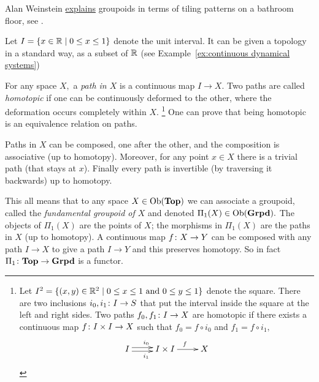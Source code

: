 \documentclass[../main/CT4S-EN-RU]{subfiles}
\begin{document}
\begin{applicationRUS}
\end{applicationRUS}

\begin{exampleENG}
Alan Weinstein \href{http://www.ams.org/notices/199607/weinstein.pdf}{\text explains} groupoids in terms of tiling patterns on a bathroom floor, see \cite{WeA}.
\end{exampleENG}

\begin{exampleRUS}
\end{exampleRUS}

\begin{exampleENG}\label{ex:fundamental groupoid}
Let $I=\{x\in{\mathbb R}{\;|\;}0\leq x\leq 1\}$ denote the unit interval. It can be given a topology in a standard way, as a subset of ${\mathbb R}$ (see Example~\ref{ex:continuous dynamical systems})

For any space $X,$ a {\em path in $X$} is a continuous map $I\to X.$ Two paths are called {\em homotopic} if one can be continuously deformed to the other, where the deformation occurs completely within $X.$
\footnote{
Let $I^2=\{(x,y)\in{\mathbb R}^2{\;|\;}0\leq x\leq 1 \textnormal{ and } 0\leq y\leq 1\}$ denote the square. There are two inclusions $i_0,i_1\colon I\rightarrow S$ that put the interval inside the square at the left and right sides. Two paths $f_0,f_1\colon I\rightarrow X$ are homotopic if there exists a continuous map $f\colon I\times I\rightarrow X$ such that $f_0=f\circ i_0$ and $f_1=f\circ i_1,$ 
$$\xymatrix{I\ar@<-.5ex>[r]_{i_1}\ar@<.5ex>[r]^{i_0}&I\times I\ar[r]^f&X}$$
} 
One can prove that being homotopic is an equivalence relation on paths. 

Paths in $X$ can be composed, one after the other, and the composition is associative (up to homotopy). Moreover, for any point $x\in X$ there is a trivial path (that stays at $x$). Finally every path is invertible (by traversing it backwards) up to homotopy. 

This all means that to any space $X\in\operatorname{Ob}({\mathbf{Top}})$ we can associate a groupoid, called the {\em fundamental groupoid of $X$} and denoted $\Pi_1(X)\in\operatorname{Ob}({\mathbf{Grpd}}).$ The objects of $\Pi_1(X)$ are the points of $X$; the morphisms in $\Pi_1(X)$ are the paths in $X$ (up to homotopy). A continuous map $f\colon X\rightarrow Y$ can be composed with any path $I\to X$ to give a path $I\to Y$ and this preserves homotopy. So in fact $\Pi_1\colon{\mathbf{Top}}\rightarrow{\mathbf{Grpd}}$ is a functor.
\end{exampleENG}
\end{document}
